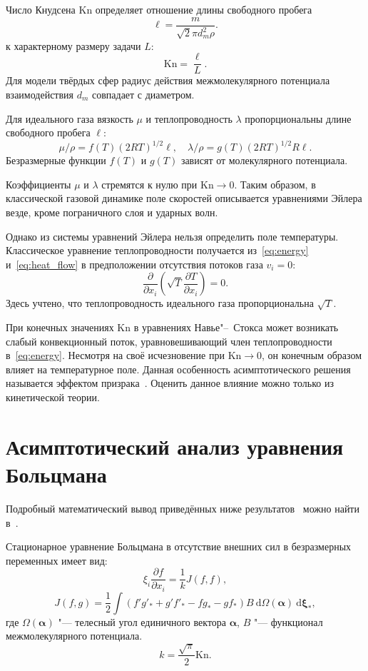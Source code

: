 \documentclass[english,russian,a4paper,12pt]{article}
\newcommand{\Kn}{\mathrm{Kn}}
\newcommand{\dd}{\:\mathrm{d}}
\newcommand{\pder}[2][]{\frac{\partial#1}{\partial#2}}
\begin{document}
Число Кнудсена \(\Kn\) определяет отношение длины свободного пробега
\begin{equation}\label{eq:ell}
	\ell = \frac{m}{\sqrt2\pi d_m^2 \rho}.
\end{equation}
к характерному размеру задачи \(L\):
\begin{equation}\label{eq:Knudsen}
	\Kn = \frac{\ell}L.
\end{equation}
Для модели твёрдых сфер радиус действия межмолекулярного потенциала взаимодействия \(d_m\)
совпадает с диаметром.

Для идеального газа вязкость \(\mu\) и теплопроводность \(\lambda\)
пропорциональны длине свободного пробега \(\ell\):
\[ \mu/\rho = f(T)(2RT)^{1/2}\ell, \quad \lambda/\rho = g(T)(2RT)^{1/2}R\ell. \]
Безразмерные функции \(f(T)\) и \(g(T)\) зависят от молекулярного потенциала.

Коэффициенты \(\mu\) и \(\lambda\) стремятся к нулю при \(\Kn\to0\).
Таким образом, в классической газовой динамике поле скоростей описывается уравнениями Эйлера везде,
кроме пограничного слоя и ударных волн.

Однако из системы уравнений Эйлера нельзя определить поле температуры.
Классическое уравнение теплопроводности получается из~\eqref{eq:energy} и~\eqref{eq:heat_flow}
в предположении отсутствия потоков газа \(v_i = 0\):
\begin{equation}\label{eq:heat_equation}
	\pder{x_i}\left(\sqrt{T}\pder[T]{x_i}\right) = 0.
\end{equation}
Здесь учтено, что теплопроводность идеального газа пропорциональна \(\sqrt{T}\).

При конечных значениях \(\Kn\) в уравнениях Навье"--~Стокса может возникать слабый конвекционный поток,
уравновешивающий член теплопроводности в~\eqref{eq:energy}.
Несмотря на своё исчезновение при \(\Kn\to0\), он конечным образом влияет на температурное поле.
Данная особенность асимптотического решения называется эффектом призрака~\cite{Sone2002, Sone2007}.
Оценить данное влияние можно только из кинетической теории.

\section{Асимптотический анализ уравнения Больцмана}
Подробный математический вывод приведённых ниже результатов~\cite{Bobylev1996} можно найти в~\cite{Sone2002}.

Стационарное уравнение Больцмана в отсутствие внешних сил в безразмерных переменных имеет вид:
\begin{equation}\label{eq:Boltzmann}
	\xi_i\pder[f]{x_i} = \frac1k J(f,f),
\end{equation}
\begin{equation}\label{eq:integral}
	J(f,g) = \frac12 \int(f'g'_*+g'f'_*-fg_*-gf_*)B\dd\Omega(\boldsymbol\alpha)\dd \boldsymbol\xi_*,
\end{equation}
где \(\Omega(\boldsymbol{\alpha})\) "--- телесный угол единичного вектора \(\boldsymbol\alpha\),
\(B\) "--- функционал межмолекулярного потенциала.
\[ k = \frac{\sqrt\pi}2\Kn.\]
\end{document}
